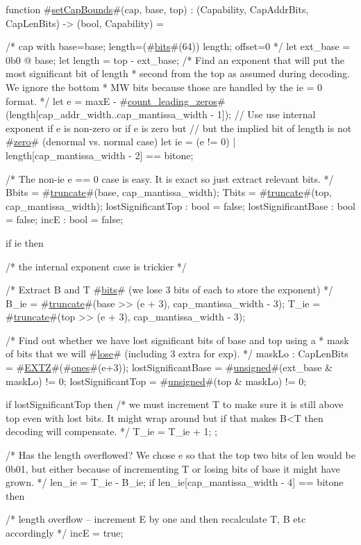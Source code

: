 function #\hyperref[sailRISCVzsetCapBounds]{setCapBounds}#(cap, base, top) : (Capability, CapAddrBits, CapLenBits) -> (bool, Capability) = {
  /* {cap with base=base; length=(#\hyperref[sailRISCVzbits]{bits}#(64)) length; offset=0} */
  let ext_base = 0b0 @ base;
  let length = top - ext_base;
  /* Find an exponent that will put the most significant bit of length
   * second from the top as assumed during decoding. We ignore the bottom
   * MW bits because those are handled by the ie = 0 format.
   */
  let e = maxE - #\hyperref[sailRISCVzcountzyleadingzyzzeros]{count\_leading\_zeros}#(length[cap_addr_width..cap_mantissa_width - 1]);
  // Use use internal exponent if e is non-zero or if e is zero but
  // but the implied bit of length is not #\hyperref[sailRISCVzzzero]{zero}# (denormal vs. normal case)
  let ie = (e != 0) | length[cap_mantissa_width - 2] == bitone;

  /* The non-ie e == 0 case is easy. It is exact so just extract relevant bits. */
  Bbits = #\hyperref[sailRISCVztruncate]{truncate}#(base, cap_mantissa_width);
  Tbits = #\hyperref[sailRISCVztruncate]{truncate}#(top, cap_mantissa_width);
  lostSignificantTop : bool = false;
  lostSignificantBase : bool = false;
  incE : bool = false;

  if ie then {
    /* the internal exponent case is trickier */

    /* Extract B and T #\hyperref[sailRISCVzbits]{bits}# (we lose 3 bits of each to store the exponent) */
    B_ie = #\hyperref[sailRISCVztruncate]{truncate}#(base >> (e + 3), cap_mantissa_width - 3);
    T_ie = #\hyperref[sailRISCVztruncate]{truncate}#(top >> (e + 3), cap_mantissa_width - 3);

    /* Find out whether we have lost significant bits of base and top using a
     * mask of bits that we will #\hyperref[sailRISCVzlose]{lose}# (including 3 extra for exp).
     */
    maskLo : CapLenBits = #\hyperref[sailRISCVzEXTZ]{EXTZ}#(#\hyperref[sailRISCVzones]{ones}#(e+3));
    lostSignificantBase = #\hyperref[sailRISCVzunsigned]{unsigned}#(ext_base & maskLo) != 0;
    lostSignificantTop  = #\hyperref[sailRISCVzunsigned]{unsigned}#(top & maskLo) != 0;

    if lostSignificantTop then {
      /* we must increment T to make sure it is still above top even with lost bits.
         It might wrap around but if that makes B<T then decoding will compensate. */
      T_ie = T_ie + 1;
    };

    /* Has the length overflowed? We chose e so that the top two bits of len would be 0b01,
       but either because of incrementing T or losing bits of base it might have grown. */
    len_ie = T_ie - B_ie;
    if len_ie[cap_mantissa_width - 4] == bitone then {
      /* length overflow -- increment E by one and then recalculate
         T, B etc accordingly */
      incE = true;

}}}

